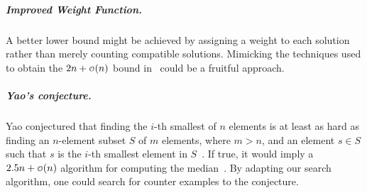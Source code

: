 \documentclass[a4paper,UKenglish,cleveref, autoref, thm-restate]{lipics-v2021}
\newcommand\smallO{
\mathchoice
{{\scriptstyle\mathcal{O}}}%
{{\scriptstyle\mathcal{O}}}%
{{\scriptscriptstyle\mathcal{O}}}%
{\scalebox{.50}{$\scriptscriptstyle\mathcal{O}$}}%
}
\begin{document}
\subparagraph{Improved Weight Function.}
A better lower bound might be achieved by assigning a weight to each solution rather than merely counting compatible solutions.
Mimicking the techniques used to obtain the $2n + \smallO(n)$ bound in~\cite{bent1985finding} could be a fruitful approach.

\subparagraph{Yao's conjecture.}
Yao conjectured that finding the $i$-th smallest of $n$ elements is at least as hard as finding an $n$-element subset $S$ of $m$ elements, where $m > n$, and an element $s \in S$ such that $s$ is the $i$-th smallest element in $S$~\cite{yao1974lower}.
If true, it would imply a $2.5n + \smallO(n)$ algorithm for computing the median~\cite{schonhage1975finding}.
By adapting our search algorithm, one could search for counter examples to the conjecture.

\clearpage




\end{document}
